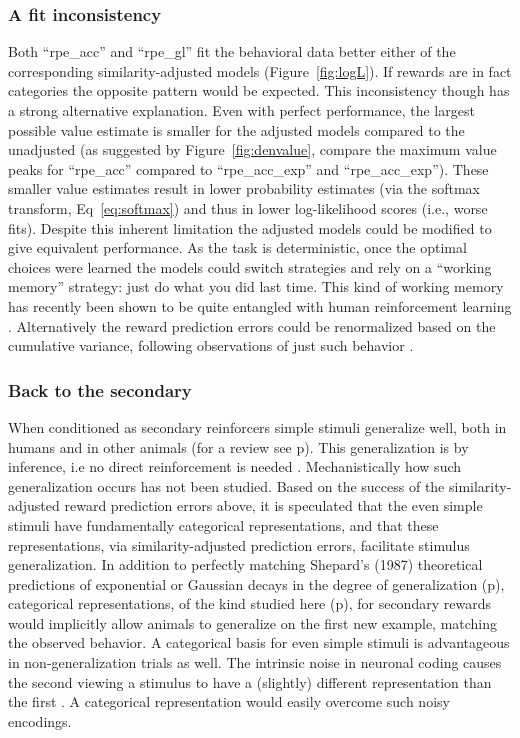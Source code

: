 \subsubsection{A fit inconsistency}
\label{subsub:inconsistency}
Both ``rpe\_acc'' and ``rpe\_gl'' fit the behavioral data better either of the corresponding similarity-adjusted models (Figure~\ref{fig:logL}).  If rewards are in fact categories the opposite pattern would be expected.  This inconsistency though has a strong alternative explanation.  Even with perfect performance, the largest possible value estimate is smaller for the adjusted models compared to the unadjusted (as suggested by Figure~\ref{fig:denvalue}, compare the maximum value peaks for ``rpe\_acc'' compared to ``rpe\_acc\_exp'' and ``rpe\_acc\_exp'').  These smaller value estimates result in lower probability estimates (via the softmax transform, Eq~\ref{eq:softmax}) and thus in lower log-likelihood scores (i.e., worse fits).  Despite this inherent limitation the adjusted models could be modified to give equivalent performance.  As the task is deterministic, once the optimal choices were learned the models could switch strategies and rely on a ``working memory'' strategy: just do what you did last time.  This kind of working memory has recently been shown to be quite entangled with human reinforcement learning \cite{Collins:2012p9779}.  Alternatively the reward prediction errors could be renormalized based on the cumulative variance, following observations of just such behavior \cite{Tobler:2005p6373}.


\subsubsection{Back to the secondary}
\label{sub:generalsense}
When conditioned as secondary reinforcers simple stimuli generalize well, both in humans and in other animals (for a review see p\pageref{subsub:birds}).  This generalization is by inference, i.e no direct reinforcement is needed \cite{Guttman:1956p8355,Nakamura:2006p9093,Smith:2011p9101}.  Mechanistically how such generalization occurs has not been studied.  Based on the success of the similarity-adjusted reward prediction errors above, it is speculated that the even simple stimuli have fundamentally categorical representations, and that these representations, via similarity-adjusted prediction errors, facilitate stimulus generalization.  In addition to perfectly matching Shepard's (1987) theoretical predictions of exponential or Gaussian decays in the degree of generalization (p\pageref{subsub:curves}), categorical representations, of the kind studied here (p\pageref{subsub:catquant}), for secondary rewards would implicitly allow animals to generalize on the first new example, matching the observed behavior.  A categorical basis for even simple stimuli is advantageous in non-generalization trials as well. The intrinsic noise in neuronal coding causes the second viewing a stimulus to have a (slightly) different representation than the first \cite{Ashby:1986p9783}.  A categorical representation would easily overcome such noisy encodings. 

